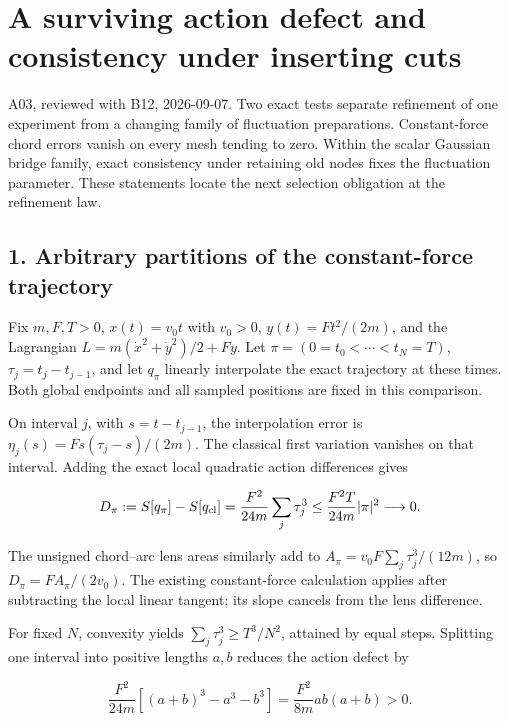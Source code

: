 \documentclass[11pt,a4paper]{article}
\begin{document}
\hypertarget{a-surviving-action-defect-and-consistency-under-inserting-cuts}{%
\section{A surviving action defect and consistency under inserting
cuts}\label{a-surviving-action-defect-and-consistency-under-inserting-cuts}}

A03, reviewed with B12, 2026-09-07. Two exact tests separate refinement
of one experiment from a changing family of fluctuation preparations.
Constant-force chord errors vanish on every mesh tending to zero. Within
the scalar Gaussian bridge family, exact consistency under retaining old
nodes fixes the fluctuation parameter. These statements locate the next
selection obligation at the refinement law.

\hypertarget{arbitrary-partitions-of-the-constant-force-trajectory}{%
\subsection{1. Arbitrary partitions of the constant-force
trajectory}\label{arbitrary-partitions-of-the-constant-force-trajectory}}

Fix \(m,F,T>0\), \(x(t)=v_0t\) with \(v_0>0\), \(y(t)=Ft^2/(2m)\), and
the Lagrangian \(L=m(\dot x^2+\dot y^2)/2+Fy\). Let
\(\pi=(0=t_0<\cdots<t_N=T)\), \(\tau_j=t_j-t_{j-1}\), and let \(q_\pi\)
linearly interpolate the exact trajectory at these times. Both global
endpoints and all sampled positions are fixed in this comparison.

On interval \(j\), with \(s=t-t_{j-1}\), the interpolation error is
\(\eta_j(s)=Fs(\tau_j-s)/(2m)\). The classical first variation vanishes
on that interval. Adding the exact local quadratic action differences
gives

\[D_\pi:=S[q_\pi]-S[q_{\rm cl}]
=\frac{F^2}{24m}\sum_j\tau_j^3
\le\frac{F^2T}{24m}|\pi|^2\longrightarrow0.\]

The unsigned chord--arc lens areas similarly add to
\(A_\pi=v_0F\sum_j\tau_j^3/(12m)\), so \(D_\pi=F A_\pi/(2v_0)\). The
existing constant-force calculation applies after subtracting the local
linear tangent; its slope cancels from the lens difference.

For fixed \(N\), convexity yields \(\sum_j\tau_j^3\ge T^3/N^2\),
attained by equal steps. Splitting one interval into positive lengths
\(a,b\) reduces the action defect by

\[\frac{F^2}{24m}[(a+b)^3-a^3-b^3]
=\frac{F^2}{8m}ab(a+b)>0.\]
\end{document}
